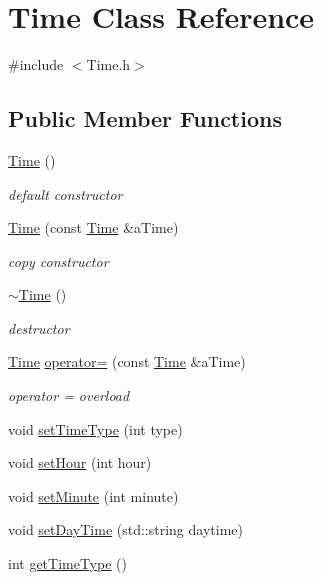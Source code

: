 \hypertarget{classTime}{}\section{Time Class Reference}
\label{classTime}


{\ttfamily \#include $<$Time.\+h$>$}

\subsection*{Public Member Functions}
\begin{DoxyCompactItemize}
\item 
\hyperlink{classTime_a4245e409c7347d1d671858962c2ca3b5}{Time} ()
\begin{DoxyCompactList}\small\item\em default constructor \end{DoxyCompactList}\item 
\hyperlink{classTime_a07d87f73be5aed8318c0c5f5d46e8afa}{Time} (const \hyperlink{classTime}{Time} \&a\+Time)
\begin{DoxyCompactList}\small\item\em copy constructor \end{DoxyCompactList}\item 
\hyperlink{classTime_a1e92dbe963fa3cdd6bea207680f5f6d1}{$\sim$\+Time} ()
\begin{DoxyCompactList}\small\item\em destructor \end{DoxyCompactList}\item 
\hyperlink{classTime}{Time} \hyperlink{classTime_ab71c472f35e89bdcbe7140e4ae180df4}{operator=} (const \hyperlink{classTime}{Time} \&a\+Time)
\begin{DoxyCompactList}\small\item\em operator = overload \end{DoxyCompactList}\item 
void \hyperlink{classTime_a8cb6f95a784663d705210a941bd9cce1}{set\+Time\+Type} (int type)
\item 
void \hyperlink{classTime_ab77d5f9f5fa8582d23a70d418ab6a182}{set\+Hour} (int hour)
\item 
void \hyperlink{classTime_a9c53c93d10be3785c85449186beb6b6a}{set\+Minute} (int minute)
\item 
void \hyperlink{classTime_a292511f90d87588d30bafbce157381a9}{set\+Day\+Time} (std\+::string daytime)
\item 
int \hyperlink{classTime_abf6028d768defb42e73d00ea0dd77fc6}{get\+Time\+Type} ()

\end{DoxyCompactItemize}
